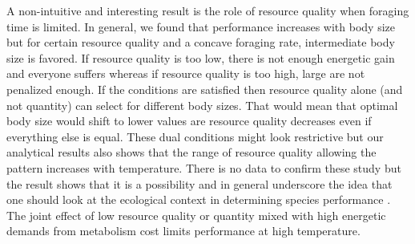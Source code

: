 A non-intuitive and interesting result is the role of resource quality when foraging time is limited.
In general, we found that performance increases with body size but for certain resource quality and a concave foraging rate,  intermediate body size is favored.
If resource quality is too low, there is not enough energetic gain and everyone suffers whereas if resource quality is too high, large are not penalized enough.
If the conditions are satisfied then resource quality alone (and not quantity) can select for different body sizes.
That would mean that optimal body size would shift to lower values are resource quality decreases even if  everything else is equal.
These dual conditions might look restrictive but our analytical results also shows that the range of resource quality allowing the pattern increases with temperature. 
There is no data to confirm these study but the result shows that it is a possibility and in general  underscore the idea that one should look at the ecological context in determining species performance \citep{Sears2015}.
The joint effect of low resource quality or quantity mixed with high energetic demands from  metabolism cost limits performance at high temperature.

